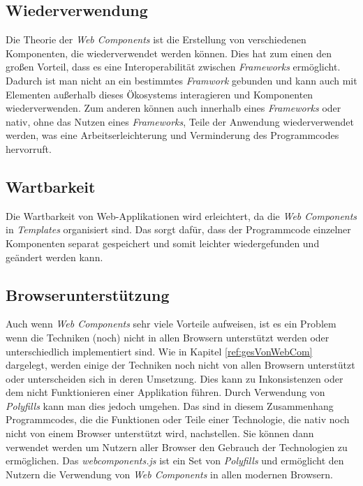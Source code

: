 \documentclass[12pt, paper=a4, bibtotoc, toc=listof, headsepline=true]{scrreprt}
\begin{document}
			\subsection{Wiederverwendung}
			Die Theorie der \emph{Web Components} ist die Erstellung von verschiedenen Komponenten, die wiederverwendet werden können. Dies hat zum einen den großen Vorteil, dass es eine Interoperabilität zwischen \emph{Frameworks} ermöglicht\cite[S.2]{patel2015learning}. Dadurch ist man nicht an ein bestimmtes \emph{Framwork} gebunden und kann auch mit Elementen außerhalb dieses Ökosystems interagieren und Komponenten wiederverwenden. Zum anderen können auch innerhalb eines \emph{Frameworks} oder nativ, ohne das Nutzen eines \emph{Frameworks}, Teile der Anwendung wiederverwendet werden, was eine Arbeitserleichterung und Verminderung des Programmcodes hervorruft. 
			\subsection{Wartbarkeit}
			Die Wartbarkeit von Web-Applikationen wird erleichtert, da die \emph{Web Components} in \emph{Templates} organisiert sind\cite[S.2]{patel2015learning}. Das sorgt dafür, dass der Programmcode einzelner Komponenten separat gespeichert und somit leichter wiedergefunden und geändert werden kann.
			\subsection{Browserunterstützung}
			Auch wenn \emph{Web Components} sehr viele Vorteile aufweisen, ist es ein Problem wenn die Techniken (noch) nicht in allen Browsern unterstützt werden oder unterschiedlich implementiert sind. Wie in Kapitel \ref{ref:gesVonWebCom} dargelegt, werden einige der Techniken noch nicht von allen Browsern unterstützt oder unterscheiden sich in deren Umsetzung. Dies kann zu Inkonsistenzen oder dem nicht Funktionieren einer Applikation führen. Durch Verwendung von  \emph{Polyfills} kann man dies jedoch umgehen. Das sind in diesem Zusammenhang Programmcodes, die die Funktionen oder Teile einer Technologie, die nativ noch nicht von einem Browser unterstützt wird, nachstellen. Sie können dann verwendet werden um Nutzern aller Browser den Gebrauch der Technologien zu ermöglichen\cite[S.4]{satrom2014building}. Das \emph{webcomponents.js} ist ein Set von \emph{Polyfills} und ermöglicht den Nutzern die Verwendung von \emph{Web Components} in allen modernen Browsern\cite{webComJs}.
\end{document}
